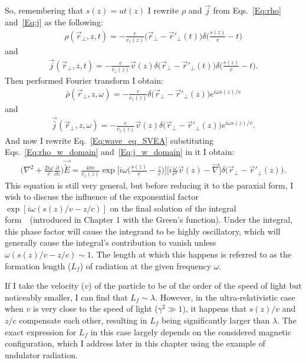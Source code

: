     So, remembering that $s(z) = u t(z)$ I rewrite $\rho$ and $\vec{j}$ from Eqs.~\ref{Eq:rho} and~\ref{Eq:j} as the following:
    \begin{align}
        \rho(\vec{r}_{\perp}, z, t) = - \frac{e}{v_z(z)}\big(\vec{r}_{\perp} - \vec{r}'_{\perp}(t)\big)\delta\bigg(\frac{s(z)}{v} - t\bigg)
    \end{align}
    and 
    \begin{align}
        \vec{j}(\vec{r}_{\perp}, z, t) = -\frac{e}{v_z(z)} \vec{v}(z)\delta \big(\vec{r}_{\perp} - \vec{r}'_{\perp}(t)\big)\delta\bigg(\frac{s(z)}{v} - t\bigg).
    \end{align}
    Then performed Fourier transform I obtain:
    \begin{align}
        \bar{\rho}(\vec{r}_{\perp}, z, \omega) = - \frac{e}{v_z(z)}\delta\big(\vec{r}_{\perp} - \vec{r}'_{\perp}(z)\big)e^{i\omega s(z)/ v}
        \label{Eq:rho_w_domain}
    \end{align}
    and
    \begin{align}
        \vec{\bar{j}}(\vec{r}_{\perp}, z, \omega) = - \frac{e}{v_z(z)} \vec{v}(z)\delta\big(\vec{r}_{\perp} - \vec{r}'_{\perp}(z)\big)e^{i\omega s(z)/ v}.
        \label{Eq:j_w_domain}
    \end{align}
    And now I rewrite Eq.~\ref{Eq:wave_eq_SVEA} substituting Eqs.~\ref{Eq:rho_w_domain} and~\ref{Eq:j_w_domain} in it I obtain:
    \begin{align}
        \bigg( \nabla^2 + \frac{2 i \omega}{c} \frac{\partial }{\partial z} \bigg) \vec{\tilde{E}} = \frac{4 \pi e}{v_z(z)} \exp{\bigg[ i\omega \bigg(\frac{s(z)}{v} - \frac{z}{c} \bigg)\bigg] \bigg[i \frac{\omega}{c^2} \vec{v}(z) - \vec{\nabla}\bigg]\delta\big(\vec{r}_{\perp} - \vec{r}'_{\perp}(z)\big)}.
        \label{Eq:nonhomogeneous_wave_eq_SVEA_mod}
    \end{align}
    This equation is still very general, but before reducing it to the paraxial form, I wish to discuss the influence of the exponential factor $\exp{[ i\omega (s(z)/v - z/c )]}$ on the final solution of the integral form~\cite{ref}~(introduced in Chapter 1 with the Green's function). Under the integral, this phase factor will cause the integrand to be highly oscillatory, which will generally cause the integral's contribution to vanish unless $\omega (s(z)/v - z/c ) \sim 1$. The length at which this happens is referred to as the formation length ($L_f$) of radiation at the given frequency $\omega$.

    If I take the velocity ($v$) of the particle to be of the order of the speed of light but noticeably smaller, I can find that $L_f \sim \lambda$. However, in the ultra-relativistic case when $v$ is very close to the speed of light ($\gamma^2 \gg 1$), it happens that $s(z)/v$ and $z/c$ compensate each other, resulting in $L_f$ being significantly larger than $\lambda$. The exact expression for $L_f$ in this case largely depends on the considered magnetic configuration, which I address later in this chapter using the example of undulator radiation.

